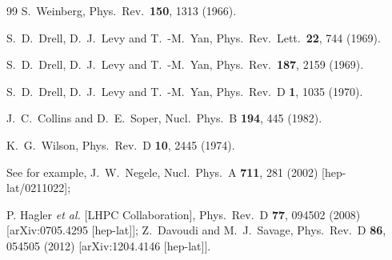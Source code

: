 \begin{thebibliography}{99}
  S.~Weinberg,
  Phys.\ Rev.\  {\bf 150}, 1313 (1966).

  S.~D.~Drell, D.~J.~Levy and T.~-M.~Yan,
  Phys.\ Rev.\ Lett.\  {\bf 22}, 744 (1969).

  S.~D.~Drell, D.~J.~Levy and T.~-M.~Yan,
  Phys.\ Rev.\  {\bf 187}, 2159 (1969).

  S.~D.~Drell, D.~J.~Levy and T.~-M.~Yan,
  Phys.\ Rev.\ D {\bf 1}, 1035 (1970).


  J.~C.~Collins and D.~E.~Soper,
  Nucl.\ Phys.\ B {\bf 194}, 445 (1982).

  K.~G.~Wilson,
  Phys.\ Rev.\ D {\bf 10}, 2445 (1974).

See for example, %
  J.~W.~Negele,
  Nucl.\ Phys.\ A {\bf 711}, 281 (2002)
  [hep-lat/0211022];

  P. Hagler {\it et al.}  [LHPC Collaboration],
  Phys.\ Rev.\ D {\bf 77}, 094502 (2008)
  [arXiv:0705.4295 [hep-lat]];
  Z.~Davoudi and M.~J.~Savage,
  Phys.\ Rev.\ D {\bf 86}, 054505 (2012)
  [arXiv:1204.4146 [hep-lat]].


\end{thebibliography}
